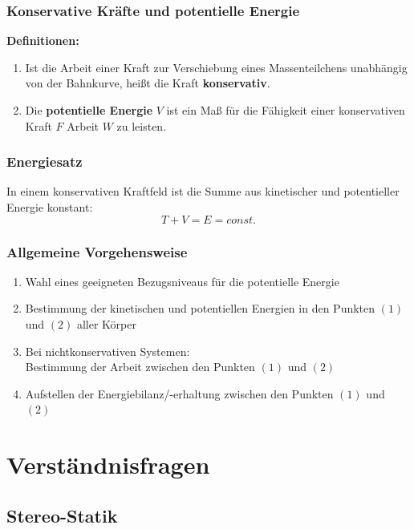 \documentclass[a4paper,twocolumn,10pt]{article}
\begin{document}
\subsubsection{Konservative Kräfte und potentielle Energie}
\textbf{Definitionen:}
\begin{enumerate}[label=$\bullet$]
\item Ist die Arbeit einer Kraft zur Verschiebung eines Massenteilchens unabhängig von der Bahnkurve, heißt die Kraft \textbf{konservativ}.
\item Die \textbf{potentielle Energie} $V$ ist ein Maß für die Fähigkeit einer konservativen Kraft $F$ Arbeit $W$ zu leisten.
\end{enumerate}

\subsubsection{Energiesatz}
In einem konservativen Kraftfeld ist die Summe aus kinetischer und potentieller Energie konstant:
\begin{equation*}
T+V=E=const.
\end{equation*}

\subsubsection{Allgemeine Vorgehensweise}
\begin{enumerate}
\item Wahl eines geeigneten Bezugsniveaus für die potentielle Energie
\item Bestimmung der kinetischen und potentiellen Energien in den Punkten $(1)$ und $(2)$ aller Körper
\item Bei nichtkonservativen Systemen:\\
Bestimmung der Arbeit zwischen den Punkten $(1)$ und $(2)$
\item Aufstellen der Energiebilanz/-erhaltung zwischen den Punkten $(1)$ und $(2)$
\end{enumerate}

\cleardoublepage

\section{Verständnisfragen}

\subsection{Stereo-Statik}
\end{document}
